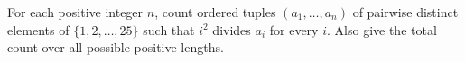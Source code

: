 For each positive integer $n$, count ordered tuples $(a_1,\ldots,a_n)$ of pairwise distinct elements of $\{1,2,\ldots,25\}$ such that $i^2$ divides $a_i$ for every $i$. Also give the total count over all possible positive lengths.

